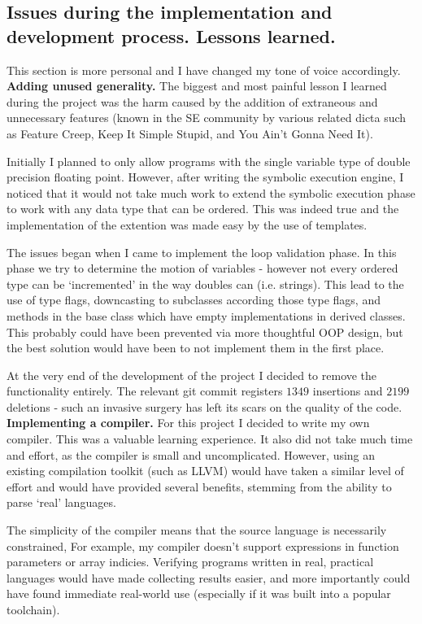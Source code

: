 \documentclass[12pt,a4paper]{article}
\begin{document}
\subsection{Issues during the implementation and development process. Lessons learned.}
This section is more personal and I have changed my tone of voice accordingly.\\


\textbf{Adding unused generality.} The biggest and most painful lesson I learned during the project was the harm caused by the addition of extraneous and unnecessary features (known in the SE community
by various related dicta such as Feature Creep, Keep It Simple Stupid, and You Ain't Gonna Need It).

Initially I planned to only allow programs with the single variable type
of double precision floating point. However, after writing the symbolic execution engine, I noticed that it would not take much work to extend the symbolic execution phase to work with any
data type that can be ordered. This was indeed true and the implementation of the extention was made easy by the use of templates.

The issues began when I came to implement the loop validation phase. In this phase we try to determine the motion of variables - however not every ordered type can be `incremented' in the way doubles can (i.e. strings). This lead to the use of type flags, downcasting to subclasses according those type flags, and methods in the
base class which have empty implementations in derived classes. This probably could have been prevented via more thoughtful OOP design, but the best solution would
have been to not implement them in the first place.

At the very end of the development of the project I decided to remove the functionality entirely. The relevant git commit registers
$1349$ insertions and $2199$ deletions - such an invasive surgery has left its scars on the quality of the code.
\\

\textbf{Implementing a compiler.} For this project I decided to write my own compiler. This was a valuable learning experience. It also did not take much time and effort, as the compiler is small
and uncomplicated. However, using an existing compilation toolkit (such as LLVM) would have taken a similar level of effort and would have provided several benefits,
stemming from the ability to parse `real' languages.

The simplicity of the compiler means that the source language is necessarily constrained, For example, my compiler doesn't support 
expressions in function parameters or array indicies. Verifying programs written in real, practical languages would have made collecting results easier, and more 
importantly could have found immediate real-world use (especially if it was built into a popular toolchain).
\end{document}
